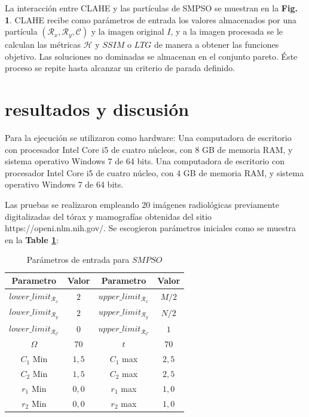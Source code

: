 \documentclass[spanish,twocolumn]{article}
\begin{document}
{La interacción entre CLAHE y las partículas de SMPSO se muestran en la \textbf {Fig. 1}. CLAHE recibe como parámetros de entrada los valores almacenados por una partícula $(\mathcal{R}_x,\mathcal{R}_y, \mathscr{C})$ y la imagen original $I$, y a la imagen procesada se le calculan las métricas $\mathscr{H}$ y $SSIM$  o $LTG$ de manera a obtener las funciones objetivo. Las soluciones no dominadas se almacenan en el conjunto pareto. Éste proceso se repite hasta alcanzar un criterio de parada definido.


\section{resultados y discusión}
\label{sec:resultadosdiscusion}

Para la ejecución se utilizaron como hardware:
Una computadora de escritorio con procesador Intel Core i5 de cuatro núcleos, con 8 GB de memoria RAM, y sistema operativo Windows 7 de 64 bits. 
Una computadora de escritorio con procesador Intel Core i5 de cuatro núcleo, con 4 GB de memoria RAM, y sistema operativo Windows 7 de 64 bits.

Las pruebas se realizaron empleando {\color{red} 20} imágenes radiológicas previamente digitalizadas del tórax y mamografías obtenidas del sitio https://openi.nlm.nih.gov/. Se escogieron parámetros iniciales como se muestra en la \textbf{Table \ref{table:parametrospso}}:

\begin{table}[h]
\begin{center}
 \begin{tabular}{||c c | c c||} 
 \hline
 Parametro & Valor & Parametro & Valor \\ [0.5ex] 
 \hline\hline
 $lower\_limit_{\mathscr{R}_x}$ & $2$ & $upper\_limit_{\mathscr{R}_x}$ & $M/2$ \\ 
 \hline
 $lower\_limit_{\mathscr{R}_y}$ & $2$ & $upper\_limit_{\mathscr{R}_y}$ & $N/2$ \\  
 \hline
 $lower\_limit_{\mathscr{R}_{\mathscr{C}}}$ & $0$ & $upper\_limit_{\mathscr{R}_{\mathscr{C}}}$ & $1$ \\
\hline
$\Omega$ & $70$ & $t$ & $70$ \\ 
\hline
$C_1$ Min & $1,5$ & $C_1$ max & $2,5$ \\ 
\hline
$C_2$ Min & $1,5$ & $C_2$ max & $2,5$ \\ 
\hline
$r_1$ Min & $0,0$ & $r_1$ max & $1,0$ \\ 
\hline
$r_2$ Min & $0,0$ & $r_2$ max & $1,0$ \\ [1ex]
\hline
\end{tabular}
\end{center}
\caption[Parámetros de entrada para $SMPSO$]{Parámetros de entrada para $SMPSO$}
\label{table:parametrospso}
\end{table}
 
}
\end{document}
